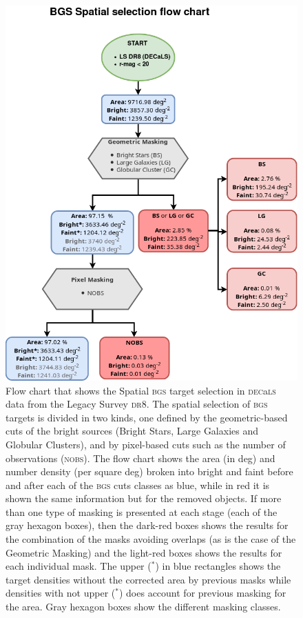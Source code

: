 \documentclass[fleqn,usenatbib]{mnras}
\newcommand{\BGS}{\textsc{bgs}\xspace}
\newcommand{\DECaLS}{\textsc{dec}a\textsc{ls}\xspace}
\newcommand{\DReight}{\textsc{dr8}\xspace}
\newcommand{\NOBS}{\textsc{nobs}\xspace}
\begin{document}
\begin{figure}
	\includegraphics[width=\columnwidth]{images/flow_geo}
    \caption{Flow chart that shows the Spatial \BGS target selection in \DECaLS data from the Legacy Survey \DReight. The spatial selection of \BGS targets is divided in two kinds, one defined by the geometric-based cuts of the bright sources (Bright Stars, Large Galaxies and Globular Clusters), and by pixel-based cuts such as the number of observations (\NOBS). The flow chart shows the area (in deg) and number density (per square deg) broken into bright and faint before and after each of the \BGS cuts classes as blue, while in red it is shown the same information but for the removed objects. If more than one type of masking is presented at each stage (each of the gray hexagon boxes), then the dark-red boxes shows the results for the combination of the masks avoiding overlaps (as is the case of the Geometric Masking) and the light-red boxes shows the results for each individual mask. The upper ($^*$) in blue rectangles shows the target densities without the corrected area by previous masks while densities with not upper ($^*$) does account for previous masking for the area. Gray hexagon boxes show the different masking classes.}
    \label{fig:flow1}
\end{figure}
\end{document}
